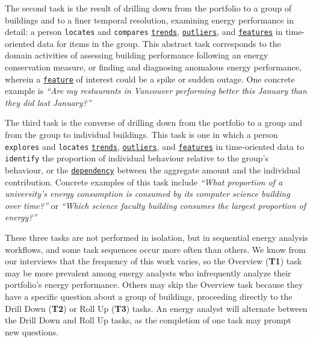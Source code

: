  The second task is the result of drilling down from the portfolio to a group of buildings and to a finer temporal resolution, examining energy performance in detail: a person {\tt locates} and {\tt compares} \underline{{\tt trends}}, \underline{{\tt outliers}}, and \underline{{\tt features}} in time-oriented data for items in the group.
This abstract task corresponds to the domain activities of assessing building performance following an energy conservation measure, or finding and diagnosing anomalous energy performance, wherein a \underline{{\tt feature}} of interest could be a spike or sudden outage.
One concrete example is {\it ``Are my restaurants in Vancouver performing better this January than they did last January?''}

 The third task is the converse of drilling down from the portfolio to a group and from the group to individual buildings.
This task is one in which a person {\tt explores} and {\tt locates} \underline{{\tt trends}}, \underline{{\tt outliers}}, and \underline{{\tt features}} in time-oriented data to {\tt identify} the proportion of individual behaviour relative to the group's behaviour, or the \underline{{\tt dependency}} between the aggregate amount and the individual contribution.
Concrete examples of this task include {\it ``What proportion of a university's energy consumption is consumed by its computer science building over time?''} or {\it ``Which science faculty building consumes the largest proportion of energy?''}

 These three tasks are not performed in isolation, but in sequential energy analysis workflows, and some task sequences occur more often than others. 
We know from our interviews that the frequency of this work varies, so the Overview ({\bf T1}) task may be more prevalent among energy analysts who infrequently analyze their portfolio's energy performance.
Others may skip the Overview task because they have a specific question about a group of buildings, proceeding directly to the Drill Down ({\bf T2}) or Roll Up ({\bf T3}) tasks. 
An energy analyst will alternate between the Drill Down and Roll Up tasks, as the completion of one task may prompt new questions.

